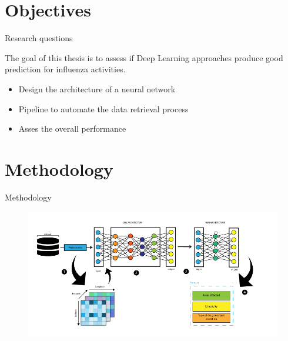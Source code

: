 \documentclass{beamer}
\begin{document}
\section{Objectives}

\begin{frame}{Research questions}

The goal of this thesis is to assess if Deep Learning approaches produce good prediction for influenza activities.
\pause
  \begin{itemize}
  
  \item<2-> {
 Design the architecture of a neural network

  }
  \item<3-> {   
Pipeline to automate the data retrieval process
  }
  \item<4-> {
Asses the overall performance 
  }

 
  \end{itemize}
  

\end{frame}




\section{Methodology}
\begin{frame}{Methodology}{}
\begin{figure}[h]
    \centering
    \includegraphics[width=\textwidth]{figure-1.png}
\end{figure}

\end{frame}
\end{document}
